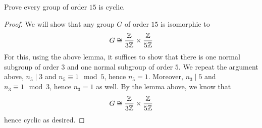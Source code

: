 \begin{prob}[F2015-Q1]
    Prove every group of order $15$ is cyclic.
\end{prob}
\begin{proof}
    We will show that any group $G$ of order $15$ is isomorphic to 
    \begin{equation*}
        G\cong\frac{\mathbb{Z}}{3\mathbb{Z}}\times\frac{\mathbb{Z}}{5\mathbb{Z}}
    \end{equation*}
    For this, using the above lemma, it suffices to show that there is one normal subgroup of order $3$ and one normal subgroup of order $5$. We repeat the argument above, $n_5\mid 3$ and $n_5\equiv 1\mod 5$, hence $n_5=1$. Moreover, $n_3\mid 5$ and $n_3\equiv 1\mod 3$, hence $n_3=1$ as well. By the lemma above, we know that 
    \begin{equation*}
        G\cong\frac{\mathbb{Z}}{3\mathbb{Z}}\times\frac{\mathbb{Z}}{5\mathbb{Z}}
    \end{equation*}
    hence cyclic as desired.
\end{proof}

